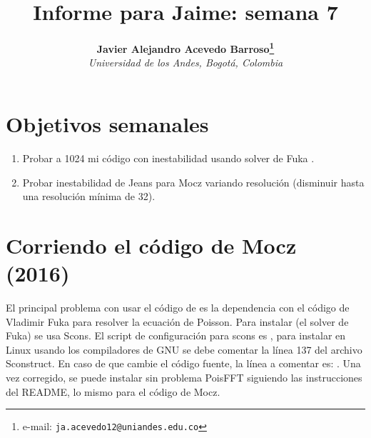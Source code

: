 \documentclass[notitlepage,letterpaper,12pt]{article} %
\begin{document}
\title{Informe para Jaime: semana 7}
\author{
\textbf{Javier Alejandro Acevedo Barroso\thanks{e-mail: \texttt{ja.acevedo12@uniandes.edu.co}}}\\
\textit{Universidad de los Andes, Bogotá, Colombia}\\
} %

\maketitle %






 

\section{Objetivos semanales}
\begin{enumerate}
\item Probar a 1024 mi código con inestabilidad usando solver de Fuka \citet{FUKA2015356}.
\item Probar inestabilidad de Jeans para Mocz variando resolución (disminuir hasta una resolución mínima de 32).
\end{enumerate}

\section{Corriendo el código de Mocz (2016)}
El principal problema con usar el código de \citet{integerLatticeDynamics} es la dependencia con el código de Vladimir Fuka para resolver la ecuación de Poisson.
Para instalar  (el solver de Fuka) se usa Scons.
El script de configuración para scons es , para instalar en Linux usando los compiladores de GNU se debe comentar la línea 137 del archivo Sconstruct.
En caso de que cambie el código fuente, la línea a comentar es: .
Una vez corregido, se puede instalar sin problema PoisFFT siguiendo las instrucciones del README, lo mismo para el código de Mocz.
\end{document}
